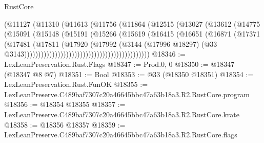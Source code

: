 \begin{lexlean}{RustCore}
\begin{coremodule}
                                              (@11127
                                                (@11310
                                                  (@11613
                                                    (@11756
                                                      (@11864
                                                        (@12515
                                                          (@13027
                                                            (@13612
                                                              (@14775
                                                                (@15091
                                                                  (@15148
                                                                    (@15191
                                                                      (@15266
                                                                        (@15619
                                                                          (@16415
                                                                            (@16651
                                                                              (@16871
                                                                                (@17371
                                                                                  (@17481
                                                                                    (@17811
                                                                                      (@17920
                                                                                        (@17992
                                                                                          (@3144
                                                                                            (@17996
                                                                                              @18297)
                                                                                            (@33
                                                                                              @3143)))))))))))))))))))))))))))))))))))))))))))))
@18346 := LexLeanPreservation.Rust.Flags
@18347 := Prod.{0, 0}
@18350 := @18347 (@18347 @8 @7)
@18351 := Bool
@18353 := @33 (@18350 @18351)
@18354 := LexLeanPreservation.Rust.FunOK
@18355 := LexLeanPreserve.C489baf7307c20a46645bbc47a63b18a3.R2.RustCore.program
@18356 := @18354 @18355
@18357 := LexLeanPreserve.C489baf7307c20a46645bbc47a63b18a3.R2.RustCore.krate
@18358 := @18356 @18357
@18359 := LexLeanPreserve.C489baf7307c20a46645bbc47a63b18a3.R2.RustCore.flags

\end{coremodule}
\end{lexlean}
